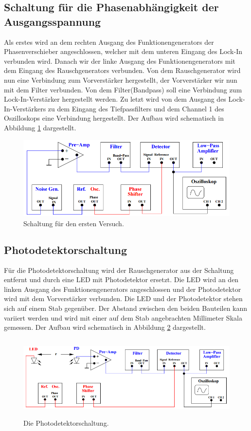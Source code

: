 \subsection{Schaltung für die Phasenabhängigkeit der Ausgangsspannung}
Als erstes wird an dem rechten Ausgang des Funktionengenerators der Phasenverschieber angeschlossen, welcher mit dem unteren Eingang des Lock-In verbunden wird. Danach wir der linke Ausgang des Funktionengenerators mit dem Eingang des Rauschgenerators verbunden. Von dem Rauschgenerator wird nun eine Verbindung zum Vorverstärker hergestellt, der Vorverstärker wir nun mit dem Filter verbunden. Von dem Filter(Bandpass) soll eine Verbindung zum Lock-In-Verstärker hergestellt werden. Zu letzt wird von dem Ausgang des Lock-In-Verstärkers zu dem Eingang des Tiefpassfilters und dem Channel 1 des Oszilloskops eine Verbindung hergestellt. Der Aufbau wird schematisch in Abbildung \ref{img:V1} dargestellt.
\begin{figure}[H]
	\centering
	\includegraphics[height=4.2cm]{picture/Aufbau-Versuch1.png}
	\caption{Schaltung für den ersten Versuch. \cite[4]{sample}}
  \label{img:V1}
\end{figure}

\subsection{Photodetektorschaltung}
Für die Photodetektorschaltung wird der Rauschgenerator aus der Schaltung entfernt und durch eine LED mit Photodetektor ersetzt. Die LED wird an den linken Ausgang des Funktionengenerators angeschlossen und der Photodetektor wird mit dem Vorverstärker verbunden. Die LED und der Photodetektor stehen sich auf einem Stab gegenüber. Der Abstand zwischen den beiden Bauteilen kann variiert werden und wird mit einer auf dem Stab angebrachten Millimeter Skala gemessen. Der Aufbau wird schematisch in Abbildung \ref{img:V2} dargestellt.
\begin{figure}[H]
	\centering
	\includegraphics[height=4.2cm]{picture/Photodetektorschaltung.png}
	\caption{Die Photodetektorschaltung. \cite[5]{sample}}
  \label{img:V2}
\end{figure}
